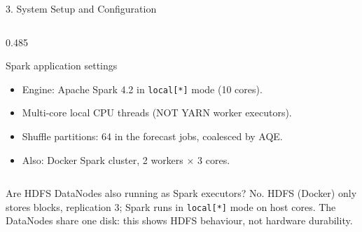 \documentclass[aspectratio=169,10pt]{beamer}
\begin{document}
\begin{frame}{3. System Setup and Configuration}
\begin{columns}[T,onlytextwidth]
    \begin{column}{0.485\textwidth}
      \begin{block}{Spark application settings}
        \footnotesize
        \begin{itemize}
          \item Engine: Apache Spark 4.2 in \texttt{local[*]} mode (10 cores).
          \item Multi-core local CPU threads (NOT YARN worker executors).
          \item Shuffle partitions: 64 in the forecast jobs, coalesced by AQE.
          \item Also: Docker Spark cluster, 2 workers $\times$ 3 cores.
        \end{itemize}
      \end{block}
    \end{column}
  \end{columns}

  \vspace{0.15cm}
  \begin{block}{Are HDFS DataNodes also running as Spark executors?}
    \footnotesize
    No. HDFS (Docker) only stores blocks, replication 3; Spark runs in \texttt{local[*]} mode on host cores. The DataNodes share one disk: this shows HDFS behaviour, not hardware durability.
  \end{block}
\end{frame}
\end{document}
